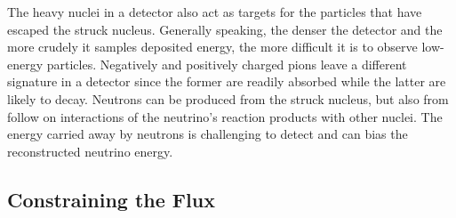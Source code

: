 

The heavy nuclei in a detector also act as targets for the particles that have escaped the struck nucleus. Generally speaking, the denser the detector and the more crudely it samples deposited energy, the more difficult it is to observe low-energy particles. Negatively and positively charged pions leave a different signature in a detector since the former are readily absorbed while the latter are likely to decay.  Neutrons can be produced from the struck nucleus, but also from follow on interactions of the neutrino's reaction products with other nuclei. The energy carried away by neutrons is challenging to detect and can bias the reconstructed neutrino energy. 



\subsection{Constraining the Flux}
\label{ssec:flux}

